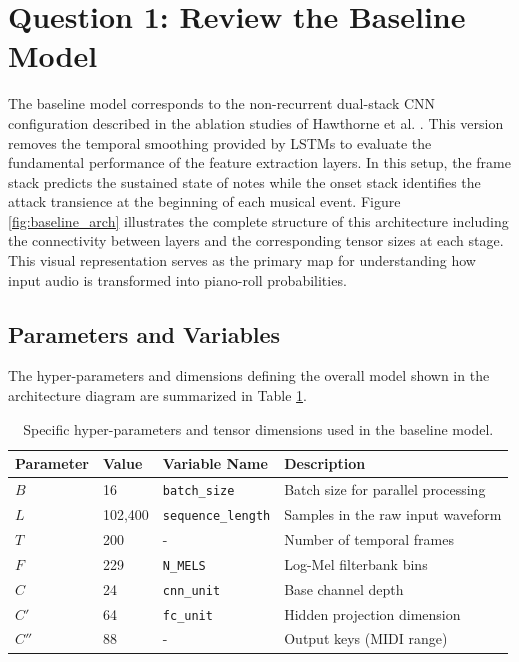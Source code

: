 \documentclass{article}
\begin{document}
\section{Question 1: Review the Baseline Model}
The baseline model corresponds to the non-recurrent dual-stack CNN configuration described in the ablation studies of Hawthorne et al. \cite{hawthorne2018onsetsframesdualobjectivepiano}. This version removes the temporal smoothing provided by LSTMs to evaluate the fundamental performance of the feature extraction layers. In this setup, the frame stack predicts the sustained state of notes while the onset stack identifies the attack transience at the beginning of each musical event. Figure \ref{fig:baseline_arch} illustrates the complete structure of this architecture including the connectivity between layers and the corresponding tensor sizes at each stage. This visual representation serves as the primary map for understanding how input audio is transformed into piano-roll probabilities.

\subsection{Parameters and Variables}The hyper-parameters and dimensions defining the overall model shown in the architecture diagram are summarized in Table \ref{tab:dimensions}.

\begin{table}[ht]
\centering
\caption{Specific hyper-parameters and tensor dimensions used in the baseline model.}
\label{tab:dimensions}
\begin{tabular}{llll}
\toprule
Parameter & Value & Variable Name & Description \\ \midrule
$B$ & 16 & \texttt{batch\_size} & Batch size for parallel processing \\
$L$ & 102,400 & \texttt{sequence\_length} & Samples in the raw input waveform \\
$T$ & 200 & - & Number of temporal frames \\
$F$ & 229 & \texttt{N\_MELS} & Log-Mel filterbank bins \\
$C$ & 24 & \texttt{cnn\_unit} & Base channel depth \\
$C'$ & 64 & \texttt{fc\_unit} & Hidden projection dimension \\
$C''$ & 88 & - & Output keys (MIDI range) \\ \bottomrule
\end{tabular}
\end{table}
\end{document}
